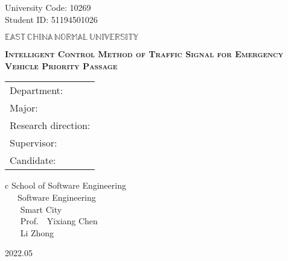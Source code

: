 \newpage

\pagestyle{empty}

\hskip 1.83cm {\large University Code: 10269}\\
\hspace*{\fill} {\large Student ID: 51194501026}

\vskip 2cm

\begin{center}
{\Huge $\mathbb{EAST}\,\mathbb{CHINA}\,\mathbb{NORMAL}\,
\mathbb{UNIVERSITY}$}
\end{center}

\vskip 3cm

\begin{center}
\bfseries{\scshape{\huge Intelligent Control Method of Traffic Signal for Emergency Vehicle Priority Passage}}\\
\end{center}

\vskip 2cm {\large
\begin{center}
\begin{tabular}{l}
Department:\\
Major:\\
Research direction:\\
Supervisor:\\
Candidate:
\end{tabular}
\begin{tabular}c
\normalsize{School of Software Engineering}\\
\hline ~~~Software Engineering    \\
\hline ~~~ Smart City    \\
\hline ~~~ Prof.~~Yixiang Chen\\
\hline ~~~ Li Zhong\\
\hline
\end{tabular}
\end{center}}

\vskip 30mm

\begin{center}
{\Large 2022.05}
\end{center}
